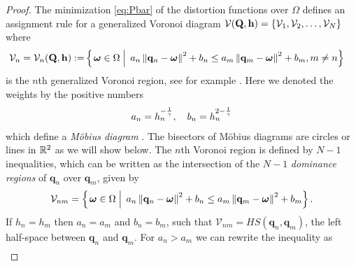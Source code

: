 \documentclass[smallabstract,smallcaptions]{dccpaper}
\newif\ifarxiv\arxivfalse
\newenvironment{remark}{\par\vspace{1.5ex}\noindent{\em Remark\/}.}{\par\vspace{1.5ex}}
\newcounter{example}[section]
\renewcommand{\vp}{\mathbf q}
\renewcommand{\vP}{\mathbf Q}
\newcommand{\gP}{\ensuremath{\vP}}          %
\newcommand{\gp}{\ensuremath{\vp}}          %
\newcommand{\bH}{\ensuremath{\vh}}          %
\newcommand{\Vor}{\ensuremath{\mathcal{V}}}         %
\begin{document}
\ifarxiv
\begin{remark}
  It is also possible that two quantization points are equal, but have different parameters. If the parameter
  ratio is very small or very large, one quantization point can become redundant, i.e., if its optimal quantization set is empty.
  In fact, if we optimize over all quantizer points, such a case will be excluded, which we will show for one-dimension
  in \lemref{lemma:allActive}.
\end{remark}
\fi
%
\ifarxiv
\begin{proof}
  The minimization \eqref{eq:Pbar} of the distortion functions over $\Omega$ defines an assignment rule for a
  generalized Voronoi diagram $\Vor(\gP,\bH)=\{\Vor_1,\Vor_2,\dots,\Vor_N\}$ where 
  \begin{align}
    \Vor_{n} =\Vor_n(\gP,\bH):=
      &\set{\vome\in\Ome}{ a_n\Norm{\vp_n-\vome}^2 +b_n \leq  a_m\Norm{\vp_m-\vome}^2 +b_m, m\not=n}
  \end{align}
  is the $n$th generalized Voronoi region, see for example \cite[Cha.3]{OBSC00}. Here we denoted the weights by the positive numbers
  \begin{align}
    a_n = h_n^{-\frac{1}{\gamma}}, \quad b_n=h_n^{2-\frac{1}{\gamma}}
  \end{align}
  which define a \emph{M{\"o}bius diagram} \cite{BK06b,BWY07}. The bisectors of M{\"o}bius diagrams are circles or lines
  in ${\mathbb R}^2$ as we will show below.
  The $n$th Voronoi region is defined by $N-1$ inequalities, which  can be written as the intersection of the $N-1$
  \emph{dominance regions} of $\vp_n$ over $\vp_m$, given by 
  \begin{align}
    \Vor_{nm}=\set{\vome\in\Ome}{ a_n\Norm{\vp_n-\vome}^2 +b_n \leq  a_m\Norm{\vp_m-\vome}^2 +b_m}.
  \end{align}
  If $h_n=h_m$ then $a_n=a_m$ and $b_n=b_m$, such that $\Vor_{nm}=HS(\vp_n,\vp_m)$, the left half-space between $\vp_n$
  and $\vp_m$. For $a_n>a_m$ we can rewrite the inequality as 
  \begin{align*}

\end{align*}
\end{proof}
\end{document}
